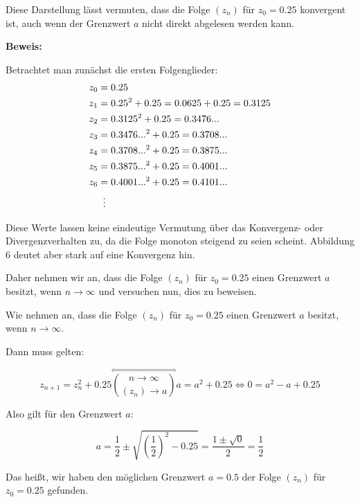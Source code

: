 \documentclass[a4paper, 12pt]{book}
\begin{document}

Diese Darstellung lässt vermuten, dass die Folge
\(\left( z_{n} \right)\) für \(z_{0} = 0.25\) konvergent ist, auch
wenn der Grenzwert \(a\) nicht direkt abgelesen werden kann.

\textbf{Beweis:}

Betrachtet man zunächst die ersten Folgenglieder:
\begin{align*}
z_{0} &= 0.25\\
z_{1} &= {0.25}^{2} + 0.25 = 0.0625 + 0.25 = 0.3125\\
z_{2} &= {0.3125}^{2} + 0.25 = 0.3476...\\
z_{3} &= {0.3476...}^{2} + 0.25 = 0.3708...\\
z_{4} &= {0.3708...}^{2} + 0.25 = 0.3875...\\
z_{5} &= {0.3875...}^{2} + 0.25 = 0.4001...\\
z_{6} &= {0.4001...}^{2} + 0.25 = 0.4101...\\
      &\vdotswithin{=} %
\end{align*}

Diese Werte lassen keine eindeutige Vermutung über das Konvergenz- oder
Divergenzverhalten zu, da die Folge monoton steigend zu seien scheint.
Abbildung 6 deutet aber stark auf eine Konvergenz hin.

Daher nehmen wir an, dass die Folge \(\left( z_{n} \right)\) für
\(z_{0} = 0.25\) einen Grenzwert \(a\) besitzt, wenn
\(n \rightarrow \infty\) und versuchen nun, dies zu beweisen.

Wie nehmen an, dass die Folge \(\left( z_{n} \right)\) für
\(z_{0} = 0.25\) einen Grenzwert \(a\) besitzt, wenn
\(n \rightarrow \infty\).

Dann muss gelten:

\[z_{n + 1} = z_{n}^{2} + 0.25\overset{\Leftrightarrow}{\binom{n \rightarrow \infty}{\left( z_{n} \right) \rightarrow a}}a = a^{2} + 0.25 \Longleftrightarrow 0 = a^{2} - a + 0.25\]

Also gilt für den Grenzwert \(a\):

\[a = \frac{1}{2} \pm \sqrt{\left( \frac{1}{2} \right)^{2} - 0.25} = \frac{1 \pm \sqrt{0}}{2} = \frac{1}{2}\]

Das heißt, wir haben den möglichen Grenzwert \(a = 0.5\) der Folge
\(\left( z_{n} \right)\) für \(z_{0} = 0.25\) gefunden.
\end{document}
